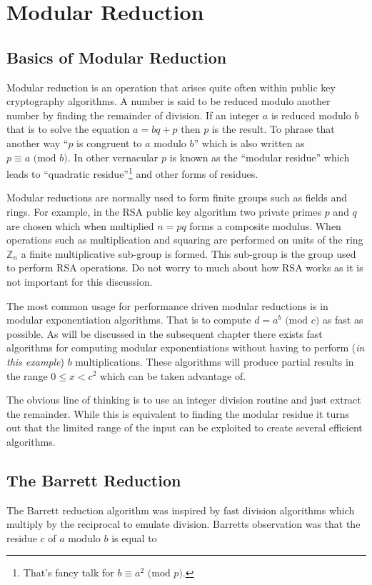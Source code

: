 \documentclass[b5paper]{book}
\def\Z{{\mathbb Z}}
\begin{document}
\chapter{Modular Reduction}
\section{Basics of Modular Reduction}
Modular reduction is an operation that arises quite often within public key cryptography algorithms.  A number is said to be reduced modulo another
number by finding the remainder of division.  If an integer $a$ is reduced modulo $b$ that is to solve the equation $a = bq + p$ then $p$ is the 
result.  To phrase that another way ``$p$ is congruent to $a$ modulo $b$'' which is also written as $p \equiv a \mbox{ (mod }b\mbox{)}$.  In
other vernacular $p$ is known as the ``modular residue'' which leads to ``quadratic residue''\footnote{That's fancy talk for $b \equiv a^2 \mbox{ (mod }p\mbox{)}$.} and
other forms of residues.  

Modular reductions are normally used to form finite groups such as fields and rings.  For example, in the RSA public key algorithm \cite{RSAPAPER} 
two private primes $p$ and $q$ are chosen which when multiplied $n = pq$ forms a composite modulus.  When operations such as multiplication and
squaring are performed on units of the ring $\Z_n$ a finite multiplicative sub-group is formed.  This sub-group is the group used to perform RSA
operations.  Do not worry to much about how RSA works as it is not important for this discussion.   

The most common usage for performance driven modular reductions is in modular exponentiation algorithms.  That is to compute 
$d = a^b \mbox{ (mod }c\mbox{)}$ as fast as possible.  As will be discussed in the subsequent chapter there exists fast algorithms for computing
modular exponentiations without having to perform (\textit{in this example}) $b$ multiplications.  These algorithms will produce partial
results in the range $0 \le x < c^2$ which can be taken advantage of.  

The obvious line of thinking is to use an integer division routine and just extract the remainder.  While this is equivalent to finding the 
modular residue it turns out that the limited range of the input can be exploited to create several efficient algorithms.  

\section{The Barrett Reduction}
The Barrett reduction algorithm \cite{BARRETT} was inspired by fast division algorithms which multiply by the reciprocal to emulate
division.  Barretts observation was that the residue $c$ of $a$ modulo $b$ is equal to 
\end{document}
